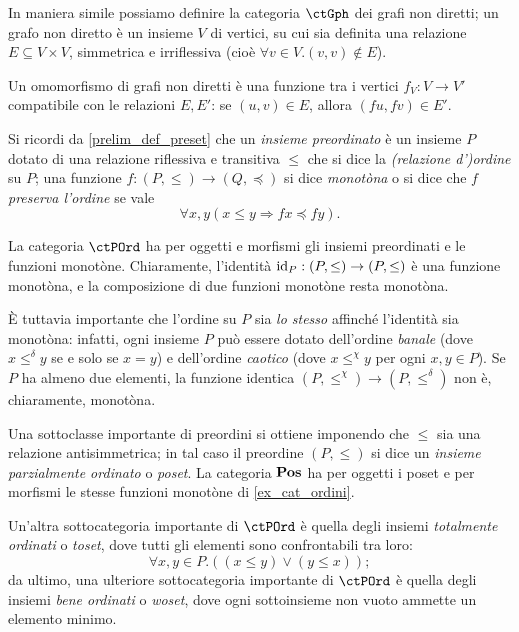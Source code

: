 \begin{example}\label{ex_cat_grafi_nondiretti}
In maniera simile possiamo definire la categoria $\ctGph$ dei grafi non diretti; un grafo non diretto è un insieme $V$ di vertici, su cui sia definita una relazione $E\subseteq V\times V$, simmetrica e irriflessiva (cioè $\forall v\in V.(v,v)\notin E$).

Un omomorfismo di grafi non diretti è una funzione tra i vertici $f_V : V\to V'$ compatibile con le relazioni $E,E'$: se $(u,v)\in E$, allora $(fu,fv)\in E'$.
\end{example}
\begin{example}\label{ex_cat_ordini}
	Si ricordi da \ref{prelim_def_preset} che un \emph{insieme preordinato} è un insieme \(P\) dotato di una relazione riflessiva e transitiva \(\le\) che si dice la \emph{(relazione d')ordine} su \(P\); una funzione \(f  : (P,\le)\to (Q,\preceq)\) si dice \emph{monotòna} o si dice che \(f\) \emph{preserva l'ordine} se vale
	\[\forall x,y(x\le y\Rightarrow fx\preceq fy).\]

	La categoria \(\ctPOrd\) ha per oggetti e morfismi gli insiemi preordinati e le funzioni monotòne. Chiaramente, l'identità \(\mathrm{id}_P : (P,\le)\to (P,\le)\) è una funzione monotòna, e la composizione di due funzioni monotòne resta monotòna.

	\`E tuttavia importante che l'ordine su \(P\) sia \emph{lo stesso} affinché l'identità sia monotòna: infatti, ogni insieme \(P\) può essere dotato dell'ordine \emph{banale} (dove \(x \mathrel{\le^\delta} y\) se e solo se \(x=y\)) e dell'ordine \emph{caotico} (dove \(x\mathrel{\le^\chi} y\) per ogni \(x,y\in P\)). Se \(P\) ha almeno due elementi, la funzione identica \((P,\le^\chi)\to (P,\le^\delta)\) non è, chiaramente, monotòna.
\end{example}
\begin{remark}[po, wo e to]\label{po_wo_to}
	Una sottoclasse importante di preordini si ottiene imponendo che \(\le\) sia una relazione antisimmetrica; in tal caso il preordine \((P,\le)\) si dice un \emph{insieme parzialmente ordinato} o \emph{poset}. La categoria \(\mathbf{Pos}\) ha per oggetti i poset e per morfismi le stesse funzioni monotòne di \ref{ex_cat_ordini}.

	Un'altra sottocategoria importante di \(\ctPOrd\) è quella degli insiemi \emph{totalmente ordinati} o \emph{toset}, dove tutti gli elementi sono confrontabili tra loro:
	\[\forall x,y\in P.((x\le y)\lor (y\le x));\]
	da ultimo, una ulteriore sottocategoria importante di \(\ctPOrd\) è quella degli insiemi \emph{bene ordinati} o \emph{woset}, dove ogni sottoinsieme non vuoto ammette un elemento minimo.
\end{remark}
